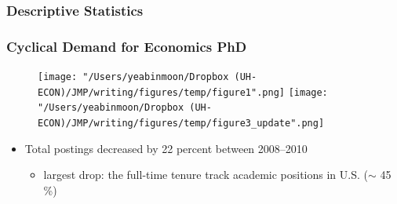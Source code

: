\documentclass[10pt,svgnames,fragile]{beamer}
\begin{document}
{\begin{frame}
		\frametitle{Descriptive Statistics}
		
	\end{frame}


\begin{frame}
	\frametitle{Cyclical Demand for Economics PhD}
	
	\begin{figure}
		\centering
		\texttt{[image: "/Users/yeabinmoon/Dropbox (UH-ECON)/JMP/writing/figures/temp/figure1".png]} 
		\texttt{[image: "/Users/yeabinmoon/Dropbox (UH-ECON)/JMP/writing/figures/temp/figure3\_update".png]} 
	\end{figure}
	

	\begin{itemize}	
		\item Total postings decreased by 22 percent between 2008--2010
		\vspace{2 mm}
		\begin{itemize}
			\item largest drop: the full-time tenure track academic positions in U.S. ($\sim$ 45 \%)
		\end{itemize}
	\end{itemize}
\end{frame}
}
\end{document}
